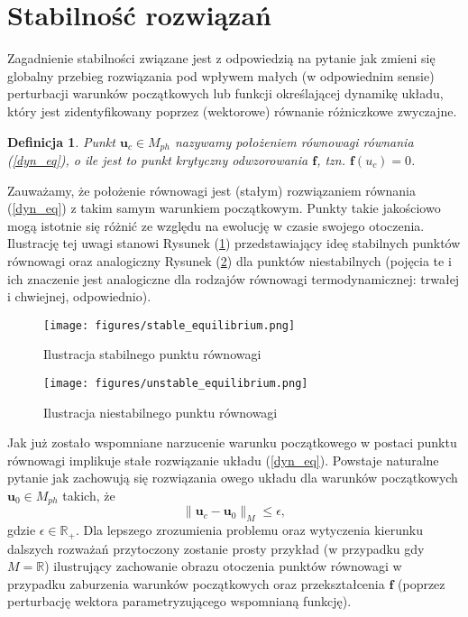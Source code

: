 \documentclass[12pt, twoside]{book}
\newtheorem{defi}{Definicja}
\begin{document}
\section{Stabilność rozwiązań}
Zagadnienie stabilności związane jest z odpowiedzią na pytanie jak zmieni się globalny przebieg rozwiązania pod wpływem małych (w odpowiednim sensie) perturbacji warunków początkowych lub funkcji określającej dynamikę układu, który jest zidentyfikowany poprzez (wektorowe) równanie różniczkowe zwyczajne.
\begin{defi}\label{crit_points}
	Punkt $ \textbf{u}_{c} \in M_{ph}$ nazywamy położeniem równowagi równania (\ref{dyn_eq}), o ile jest to punkt krytyczny odwzorowania $ \textbf{f} $, tzn. $ \textbf{f}(u_{c}) = 0 $.
\end{defi}
Zauważamy, że położenie równowagi jest (stałym) rozwiązaniem równania (\ref{dyn_eq}) z takim samym warunkiem początkowym. Punkty takie jakościowo mogą istotnie się różnić ze względu na ewolucję w czasie swojego otoczenia. Ilustrację tej uwagi stanowi Rysunek (\ref{Fig2}) przedstawiający ideę stabilnych  punktów równowagi oraz analogiczny Rysunek (\ref{Fig3}) dla punktów niestabilnych (pojęcia te i ich znaczenie jest analogiczne dla rodzajów równowagi termodynamicznej: trwałej i chwiejnej, odpowiednio).
\begin{figure}[H]
	\texttt{[image: figures/stable\_equilibrium.png]}
	\centering
	\caption{Ilustracja stabilnego punktu równowagi}
	\label{Fig2}
\end{figure}
\begin{figure}[H]
	\texttt{[image: figures/unstable\_equilibrium.png]} 
	\centering
	\caption{Ilustracja niestabilnego punktu równowagi}
	\label{Fig3}
\end{figure}
Jak już zostało wspomniane narzucenie warunku początkowego w postaci punktu równowagi implikuje stałe rozwiązanie układu (\ref{dyn_eq}). Powstaje naturalne pytanie jak zachowują się rozwiązania owego układu dla warunków początkowych  $ \textbf{u}_{0} \in M_{ph}$ takich, że
\begin{equation}
	\| \textbf{u}_{c} - \textbf{u}_{0} \|_{M}  \leq \epsilon,
\label{x_xc}
\end{equation}
gdzie $ \epsilon \in \mathbb{R}_{+} $.\newline
Dla lepszego zrozumienia problemu oraz wytyczenia kierunku dalszych rozważań przytoczony zostanie prosty przykład (w przypadku gdy $ M = \mathbb{R} $) ilustrujący zachowanie obrazu otoczenia punktów równowagi w przypadku zaburzenia warunków początkowych oraz przekształcenia $ \textbf{f} $ (poprzez perturbację wektora parametryzującego wspomnianą funkcję). \newline
\end{document}
